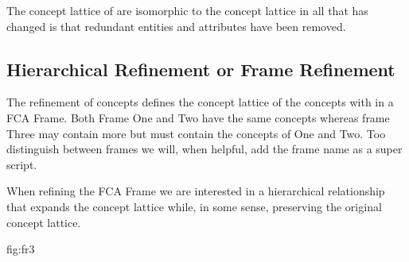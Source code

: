 

 
  


The concept lattice  of  are isomorphic to the concept lattice  in  all that has changed is that redundant entities and attributes have been removed. 
  
 \subsection{Hierarchical Refinement or Frame Refinement}\label{sec:Href}
 The refinement of concepts defines the concept lattice of the concepts with in a FCA Frame.   Both Frame One and Two have the same concepts whereas frame Three may contain more but must contain the concepts of One and Two. Too distinguish between frames we will, when helpful, add the frame name as a super script.

  
 When refining the FCA Frame we are interested in a  hierarchical relationship that expands the concept lattice while, in some sense, preserving the original concept lattice.

 {fig:fr3}
 
